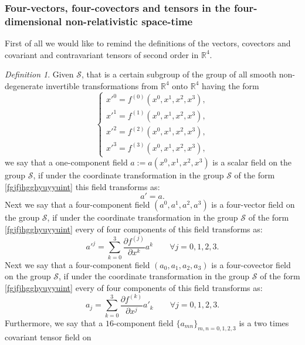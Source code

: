 \documentclass{article}
\theoremstyle{definition}
\newtheorem{definition}{Definition}[section]
\theoremstyle{remark}
\newcommand{\er}{\eqref}
\newcommand{\er}{\eqref}
\newtheorem{definition}{Definition}
\begin{document}
\subsubsection{Four-vectors, four-covectors and tensors in the
four-dimensional non-relativistic space-time} First of all we would
like to remind the definitions of the vectors, covectors and
covariant and contravariant tensors of second order in
$\mathbb{R}^4$.
\begin{definition}
Given $\mathcal{S}$, that is a certain subgroup of the group of all
smooth non-degenerate invertible transformations from $\mathbb{R}^4$
onto $\mathbb{R}^4$ having the form
\begin{equation}\label{fgjfjhgghyuyyuint}
\begin{cases}
x'^0=f^{(0)}(x^0,x^1,x^2,x^3),\\
x'^1=f^{(1)}(x^0,x^1,x^2,x^3),\\
x'^2=f^{(2)}(x^0,x^1,x^2,x^3),\\
x'^3=f^{(3)}(x^0,x^1,x^2,x^3),
\end{cases}
\end{equation}
we say that a one-component field $a:=a(x^0,x^1,x^2,x^3)$ is a
scalar field on the group $\mathcal{S}$, if under the coordinate
transformation in the group $\mathcal{S}$ of the form
\er{fgjfjhgghyuyyuint} this field transforms as:
\begin{equation}\label{fgjfjhgghhgjgihhiint}
a'=a.
\end{equation}
Next we say that a four-component field $(a^0,a^1,a^2,a^3)$ is a
four-vector field on the group $\mathcal{S}$, if under the
coordinate transformation in the group $\mathcal{S}$ of the form
\er{fgjfjhgghyuyyuint} every of four components of this field
transforms as:
\begin{equation}\label{fgjfjhgghhgjgint}
a'^j=\sum_{k=0}^{3}\frac{\partial f^{(j)}}{\partial
x^k}a^k\quad\quad\forall j=0,1,2,3.
\end{equation}
Next we say that a four-component field $(a_0,a_1,a_2,a_3)$ is a
four-covector field on the group $\mathcal{S}$, if under the
coordinate transformation in the group $\mathcal{S}$ of the form
\er{fgjfjhgghyuyyuint} every of four components of this field
transforms as:
\begin{equation}\label{fgjfjhgghhgjghjhjint}
a_j=\sum_{k=0}^{3}\frac{\partial f^{(k)}}{\partial
x^j}a'_k\quad\quad\forall j=0,1,2,3.
\end{equation}
Furthermore, we say that a $16$-component field
$\{a_{mn}\}_{m,n=0,1,2,3}$ is a two times covariant tensor field on

\end{definition}
\end{document}
